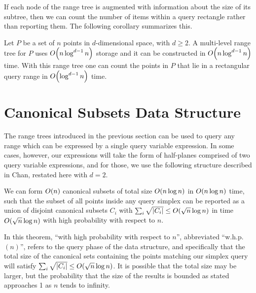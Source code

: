 If each node of the range tree is augmented with information about the size of its subtree, then we can count the number of items within a query rectangle rather than reporting them. The following corollary summarizes this.

\begin{corollary}
\label{cor:rangetree}
Let $P$ be a set of $n$ points in $d$-dimensional space, with $d \geq 2$. A multi-level range tree for $P$ uses $O\!\left(n \log^{d-1}{n}\right)$ storage and it can be constructed in $O\!\left(n \log^{d-1}{n}\right)$ time. With this range tree one can count the points in $P$ that lie in a rectangular query range in $O\!\left(\log^{d-1}{n}\right)$ time.
\end{corollary}


\section{Canonical Subsets Data Structure}
\label{:prelim:chan}

The range trees introduced in the previous section can be used to query any range which can be expressed by a single query variable expression.
In some cases, however, our expressions will take the form of half-planes comprised of two query variable expressions, and for those, we use the following structure described in Chan\cite{chan2012}, restated here with $d=2$.

\begin{theorem}
\label{th:chan}
We can form $O\!\left(n\right)$ canonical subsets of total size $O\!\left(n \log{n}\right)$ in $O\!\left(n \log{n}\right)$ time, such that the subset of all points inside any query simplex can be reported as a union of disjoint canonical subsets $C_i$ with $\sum_i{\sqrt{|C_i|}} \leq O\!\left(\sqrt{n}\log{n}\right)$ in time $O\!\left(\sqrt{n}\log{n}\right)$ with high probability with respect to $n$.
\end{theorem}

In this theorem, ``with high probability with respect to $n$'', abbreviated ``w.h.p. $(n)$'', refers to the query phase of the data structure, and specifically that the total size of the canonical sets containing the points matching our simplex query will satisfy $\sum_i{\sqrt{|C_i|}} \leq O\!\left(\sqrt{n}\log{n}\right)$.
It is possible that the total size may be larger, but the probability that the size of the results is bounded as stated approaches 1 as $n$ tends to infinity.

